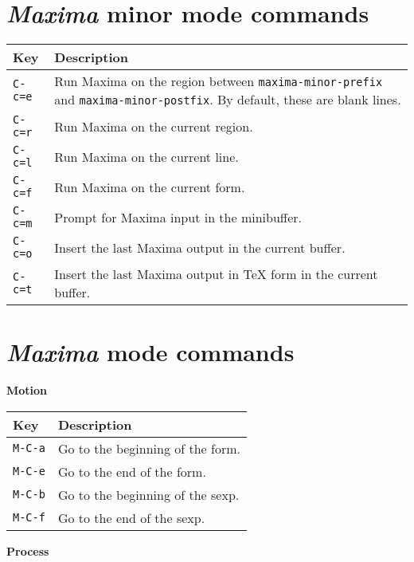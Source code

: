 \documentclass{article}
\newcommand{\mx}{\textsl{\sffamily Maxima}}
\newcommand{\hyph}{-\hspace{0pt}}
\begin{document}
\section{\mx{} minor mode commands}
\label{app:intmxmin}

\smallskip

\begin{tabular}{p{\firstcol}p{\secondcol}}
\hline
\textbf{Key} & \textbf{Description}\\
\hline
\texttt{C-c=e} & Run Maxima on the region between
\texttt{maxima\hyph{}minor\hyph{}prefix} and \texttt{maxima\hyph{}minor\hyph{}postfix}.  By
default, these are blank lines.\\
\texttt{C-c=r} & Run Maxima on the current region. \\
\texttt{C-c=l} & Run Maxima on the current line.\\
\texttt{C-c=f} & Run Maxima on the current form.\\
\texttt{C-c=m} & Prompt for Maxima input in the minibuffer.\\
\texttt{C-c=o} & Insert the last Maxima output in the current
buffer.\\
\texttt{C-c=t} & Insert the last Maxima output in \TeX{} form in the
current buffer.
\end{tabular}


\section{\mx{} mode commands}
\label{app:mxmode}

\smallskip

\noindent
\textbf{Motion}

\smallskip

\noindent
\begin{tabular}{p{\firstcol}p{\secondcol}}
\hline
\textbf{Key} & \textbf{Description}\\
\hline
\texttt{M-C-a} & Go to the beginning of the form.\\
\texttt{M-C-e} & Go to the end of the form.\\
\texttt{M-C-b} & Go to the beginning of the sexp.\\
\texttt{M-C-f} & Go to the end of the sexp.
\end{tabular}

\smallskip

\noindent
\textbf{Process}

\smallskip
\end{document}

